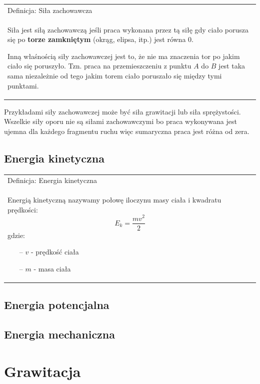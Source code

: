 \documentclass[a4paper]{article}
\newenvironment{definition}[2][Definicja]
    {
        \begin{center}
        \begin{tabular}{|p{1\textwidth}|}
        \hline
            #1: #2\\[2ex]
        \begin{em}
        \Large
    }
    { 
        \end{em}
        \\\hline
        \end{tabular} 
        \end{center}
    }
\begin{document}
    \begin{definition}{Siła zachowawcza}
        Siła jest siłą zachowawczą jeśli praca wykonana przez tą siłę gdy ciało porusza się po 
        \textbf{torze zamkniętym} (okrąg, elipsa, itp.) jest równa 0. 
        
        Inną właśnością siły zachowawczej jest to, że nie ma znaczenia tor po jakim ciało się poruszyło.
        Tzn. praca na przemieszczeniu z punktu $A$ do $B$ jest taka sama niezależnie od tego jakim 
        torem ciało poruszało się między tymi punktami.
    \end{definition}

    \noindent Przykładami siły zachowawczej może być siła grawitacji lub siła sprężystości. Wszelkie
    siły oporu nie są siłami zachowawczymi bo praca wykonywana jest ujemna dla każdego fragmentu ruchu 
    więc sumaryczna praca jest różna od zera.

    \subsection{\LARGE Energia kinetyczna}
    \begin{definition}{Energia kinetyczna}
        Energią kinetyczną nazywamy połowę iloczynu masy ciała i kwadratu prędkości:
        \[E_k = \frac{mv^2}{2}\]
        gdzie:
        \begin{itemize}
            \item[--] $v$ - prędkość ciała
            \item[--] $m$ - masa ciała 
        \end{itemize}
    \end{definition}

    \subsection{\LARGE Energia potencjalna}

    \subsection{\LARGE Energia mechaniczna}

    \pagebreak
    \section{\huge Grawitacja}
\end{document}
